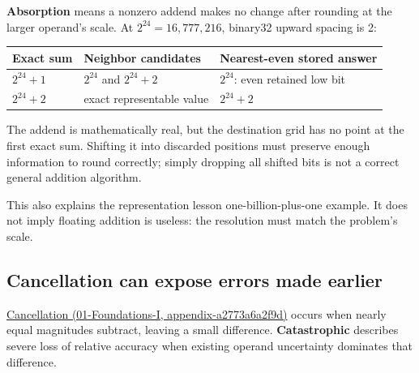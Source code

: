 \textbf{Absorption} means a nonzero addend makes no change after rounding at the larger operand's scale. At \(2^{24}=16{,}777{,}216\), binary32 upward spacing is 2:

{\def\LTcaptype{none} %
\begin{longtable}[]{@{}
  >{\raggedright\arraybackslash}p{}
  >{\raggedright\arraybackslash}p{}
  >{\raggedright\arraybackslash}p{}@{}}
\toprule\noalign{}
\begin{minipage}[b]{\linewidth}\raggedright
Exact sum
\end{minipage} & \begin{minipage}[b]{\linewidth}\raggedright
Neighbor candidates
\end{minipage} & \begin{minipage}[b]{\linewidth}\raggedright
Nearest-even stored answer
\end{minipage} \\
\midrule\noalign{}
\endhead
\bottomrule\noalign{}
\endlastfoot
\(2^{24}+1\) & \(2^{24}\) and \(2^{24}+2\) & \(2^{24}\): even retained low bit \\
\(2^{24}+2\) & exact representable value & \(2^{24}+2\) \\
\end{longtable}
}

The addend is mathematically real, but the destination grid has no point at the first exact sum. Shifting it into discarded positions must preserve enough information to round correctly; simply dropping all shifted bits is not a correct general addition algorithm.

This also explains the representation lesson one-billion-plus-one example. It does not imply floating addition is useless: the resolution must match the problem's scale.

\subsection{Cancellation can expose errors made earlier}\label{05-engine-i-ch001-cancellation-can-expose-errors-made-earlier}

\href{../01-Foundations-I/main.pdf\#nameddest=appendix-a2773a6a2f9d}{Cancellation (01-Foundations-I, appendix-a2773a6a2f9d)} occurs when nearly equal magnitudes subtract, leaving a small difference. \textbf{Catastrophic} describes severe loss of relative accuracy when existing operand uncertainty dominates that difference.

